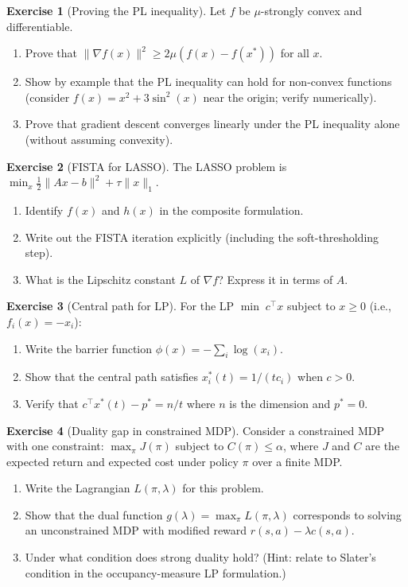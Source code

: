 \documentclass[11pt,a4paper]{article}
\theoremstyle{definition}
\newtheorem{exercise}{Exercise}[section]
\theoremstyle{plain}
\theoremstyle{remark}
\begin{document}
\begin{exercise}[Proving the PL inequality]\label{ex:pl}
Let $f$ be $\mu$-strongly convex and differentiable.
\begin{enumerate}[label=(\alph*)]
  \item Prove that $\|\nabla f(x)\|^2 \ge 2\mu(f(x) - f(x^*))$ for all $x$.
  \item Show by example that the PL inequality can hold for non-convex
    functions (consider $f(x) = x^2 + 3\sin^2(x)$ near the origin; verify
    numerically).
  \item Prove that gradient descent converges linearly under the PL inequality
    alone (without assuming convexity).
\end{enumerate}
\end{exercise}

\begin{exercise}[FISTA for LASSO]\label{ex:fista-lasso}
The LASSO problem is $\min_x \frac{1}{2}\|Ax - b\|^2 + \tau\|x\|_1$.
\begin{enumerate}[label=(\alph*)]
  \item Identify $f(x)$ and $h(x)$ in the composite formulation.
  \item Write out the FISTA iteration explicitly (including the
    soft-thresholding step).
  \item What is the Lipschitz constant $L$ of $\nabla f$? Express it in terms
    of $A$.
\end{enumerate}
\end{exercise}

\begin{exercise}[Central path for LP]\label{ex:lp-barrier}
For the LP $\min\; c^\top x$ subject to $x \ge 0$ (i.e., $f_i(x) = -x_i$):
\begin{enumerate}[label=(\alph*)]
  \item Write the barrier function $\phi(x) = -\sum_i \log(x_i)$.
  \item Show that the central path satisfies $x^*_i(t) = 1/(tc_i)$ when $c > 0$.
  \item Verify that $c^\top x^*(t) - p^* = n/t$ where $n$ is the dimension
    and $p^* = 0$.
\end{enumerate}
\end{exercise}

\begin{exercise}[Duality gap in constrained MDP]\label{ex:cmdp}
Consider a constrained MDP with one constraint: $\max_\pi J(\pi)$ subject to
$C(\pi) \le \alpha$, where $J$ and $C$ are the expected return and expected
cost under policy $\pi$ over a finite MDP.
\begin{enumerate}[label=(\alph*)]
  \item Write the Lagrangian $L(\pi, \lambda)$ for this problem.
  \item Show that the dual function $g(\lambda) = \max_\pi L(\pi, \lambda)$
    corresponds to solving an unconstrained MDP with modified reward
    $r(s,a) - \lambda c(s,a)$.
  \item Under what condition does strong duality hold? (Hint: relate to
    Slater's condition in the occupancy-measure LP formulation.)
\end{enumerate}
\end{exercise}
\end{document}
